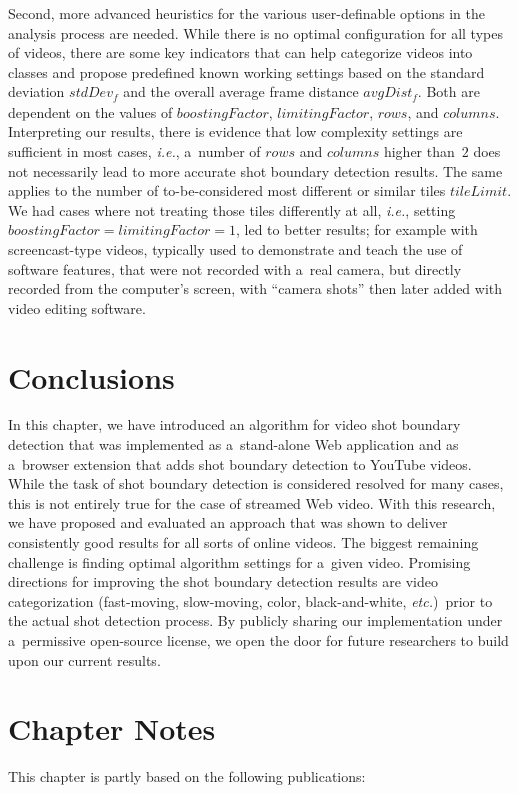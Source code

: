 Second, more advanced heuristics for the various user-definable
options in the analysis process are needed.
While there is no optimal configuration for all types of videos,
there are some key indicators that can help categorize videos
into classes and propose predefined known working settings
based on the standard deviation $\mathit{stdDev_{f}}$
and the overall average frame distance $\mathit{avgDist_{f}}$.
Both are dependent on the values of $\mathit{boostingFactor}$,
$\mathit{limitingFactor}$, $\mathit{rows}$, and $\mathit{columns}$. 
Interpreting our results, there is evidence
that low complexity settings are sufficient in most cases,
\emph{i.e.}, a~number of $\mathit{rows}$ and $\mathit{columns}$
higher than~$\mathit{2}$ does not necessarily
lead to more accurate shot boundary detection results.
The same applies to the number of to-be-considered most different
or similar tiles $\mathit{tileLimit}$.
We had cases where not treating those tiles differently
at all, \emph{i.e.}, setting
$\mathit{boostingFactor} = \mathit{limitingFactor} = \mathit{1}$, 
led to better results; for example with screencast-type videos,
typically used to demonstrate and teach the use of software features,
that were not recorded with a~real camera,
but directly recorded from the computer's screen, with ``camera shots''
then later added with video editing software.

\section{Conclusions}

In this chapter, we have introduced an algorithm for video shot boundary detection
that was implemented as a~stand-alone Web application
and as a~browser extension that adds shot boundary detection to YouTube videos.
While the task of shot boundary detection is considered resolved for many cases,
this is not entirely true for the case of streamed Web video.
With this research, we have proposed and evaluated an approach
that was shown to deliver consistently good results for all sorts of online videos.
The biggest remaining challenge is finding optimal algorithm settings
for a~given video.
Promising directions for improving the shot boundary detection results
are video categorization (fast-moving, slow-moving, color, black-and-white, \emph{etc.})\ prior
to the actual shot detection process.
By publicly sharing our implementation under a~permissive open-source license,
we open the door for future researchers to build upon our current results.

\section*{Chapter Notes}
This chapter is partly based on the following publications:



